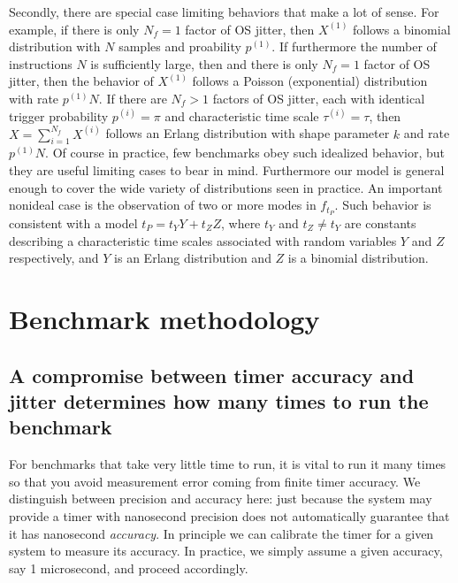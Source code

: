\documentclass[conference]{IEEEtran}
\begin{document}
Secondly, there are special case limiting behaviors that make a lot of sense. For example, if there is only $N_f = 1$ factor of OS jitter, then $X^{(1)}$ follows a binomial distribution with $N$ samples and proability $p^{(1)}$. If furthermore the number of instructions $N$ is sufficiently large, then and there is only $N_f = 1$ factor of OS jitter, then the behavior of $X^{(1)}$ follows a Poisson (exponential) distribution with rate $p^{(1)} N$. If there are $N_f > 1$ factors of OS jitter, each with identical trigger probability $p^{(i)} = \pi$ and characteristic time scale $\tau^{(i)} = \tau$, then $X = \sum_{i=1}^{N_f} X^{(i)}$ follows an Erlang distribution with shape parameter $k$ and rate $p^{(1)} N$. Of course in practice, few benchmarks obey such idealized behavior, but they are useful limiting cases to bear in mind. Furthermore our model is general enough to cover the wide variety of distributions seen in practice. An important nonideal case is the observation of two or more modes in $f_{t_P}$. Such behavior is consistent with a model $t_P = t_Y Y + t_Z Z$, where $t_Y$ and $t_Z \ne t_Y$ are constants describing a characteristic time scales associated with random variables $Y$ and $Z$ respectively, and $Y$ is an Erlang distribution and $Z$ is a binomial distribution.




\section{Benchmark methodology}


\label{sec:linearsearch}
\subsection{A compromise between timer accuracy and jitter determines how many times to run the benchmark}

For benchmarks that take very little time to run, it is vital to run it many times so that you avoid measurement error coming from finite timer accuracy. We distinguish between precision and accuracy here: just because the system may provide a timer with nanosecond precision does not automatically guarantee that it has nanosecond \textit{accuracy}. In principle we can calibrate the timer for a given system to measure its accuracy. In practice, we simply assume a given accuracy, say 1 microsecond, and proceed accordingly.
\end{document}
